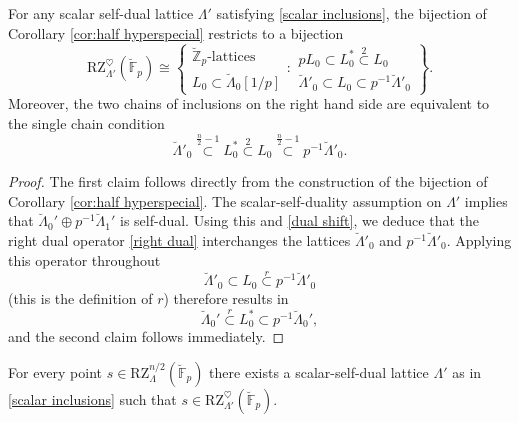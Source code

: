 \documentclass[11pt]{alggeom}
\newcommand{\iso}{\cong}
\newcommand{\Z}{\mathbb Z}
\newcommand{\F}{\mathbb F}
\begin{document}
\begin{proposition}\label{prop:heartpoints}
For any scalar self-dual lattice $\Lambda'$ satisfying \eqref{scalar inclusions}, 
the bijection of Corollary \ref{cor:half hyperspecial} restricts to a bijection
\[
\mathrm{RZ}^\heartsuit_{\Lambda'}( \breve{\F}_p) 
\iso
\left\{
\begin{array}{c}  \breve{\Z}_p\mbox{-lattices }   \\  L_0  \subset  \breve{\Lambda}_0[1/p]  \end{array} : 
\begin{array}{c}
pL_0 \subset L_0^* \stackrel{2}{\subset} L_0\\
    \breve{\Lambda}'_0  \subset  L_0  \subset p^{-1} \breve{\Lambda}'_0 
  \end{array}  \right\} .
\]
Moreover, the two chains of inclusions on the right hand side are equivalent to the single chain condition
\[
  \breve{\Lambda}'_0   \stackrel{\frac{n}{2}-1} { \subset } L_0^* \stackrel{2}{\subset}  L_0  \stackrel{\frac{n}{2}-1} { \subset }p^{-1} \breve{\Lambda}'_0   .
  \]
\end{proposition}


\begin{proof}
The first claim follows directly from the construction of the bijection of Corollary \ref{cor:half hyperspecial}.
The scalar-self-duality assumption on $\Lambda'$ implies that $\breve{\Lambda}_0'\oplus p^{-1} \breve{\Lambda}_1'$ is self-dual.  Using this and  \eqref{dual shift}, we deduce that the right dual   operator \eqref{right dual}  interchanges the lattices $\breve{\Lambda}'_0$ and $p^{-1} \breve{\Lambda}'_0$.  
Applying this operator throughout
\[
\breve{\Lambda}'_0  \subset L_0  \stackrel{r}{\subset} p^{-1} \breve{\Lambda}'_0
\]
(this is the definition of $r$) therefore results in
\[
\breve{\Lambda}_0'\stackrel{r}{\subset}  L_0^* \subset  p^{-1} \breve{\Lambda}_0' ,
\]
and the second claim follows immediately.
\end{proof}

\begin{proposition}\label{prop:heart decomp}
For every point $s\in \mathrm{RZ}_\Lambda^{n/2}(\breve{\F}_p)$ there exists a  scalar-self-dual lattice $\Lambda'$ as in \eqref{scalar inclusions} such that 
$s\in \mathrm{RZ}_{\Lambda'}^\heartsuit   (\breve{\F}_p)$.
\end{proposition}
\end{document}
